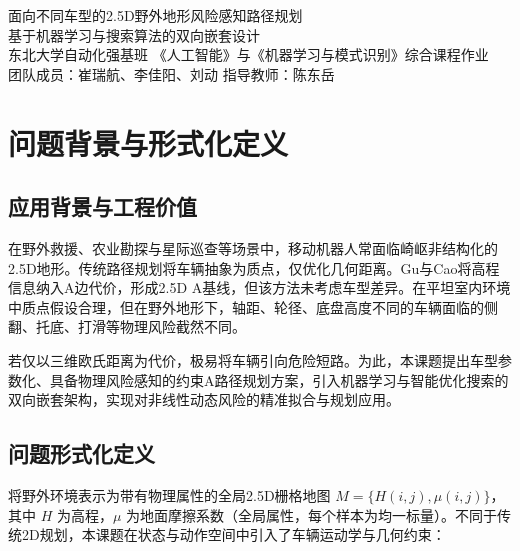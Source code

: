 \documentclass[12pt, a4paper]{article}
\begin{document}
{\centering
{\LARGE \heiti 面向不同车型的2.5D野外地形风险感知路径规划}\\[0.3ex]
{\Large \heiti 基于机器学习与搜索算法的双向嵌套设计}\\[1ex]
{\normalsize 东北大学自动化强基班 《人工智能》与《机器学习与模式识别》综合课程作业}\\[0.5ex]
{\normalsize 团队成员：崔瑞航、李佳阳、刘动 \quad 指导教师：陈东岳}\\[0.5ex]
\par}

\begin{abstract}
在野外复杂的2.5D地形中，传统仅依赖距离的路径规划方法难以适应不同车辆的物理通行能力差异。本设计提出了一种融合机器学习与智能优化搜索的路径规划架构：外层引入带有物理先验的风险约束A*算法，内层采用粒子群优化对CNN+MLP多任务风险预测模型进行拓扑与参数寻优。结合Gazebo物理仿真生成的高保真数据集以及ML+Geometric Guard保底机制，方案成功实现了同一复杂地形下针对不同车辆参数的自适应、低风险差异化规划。实验表明，该架构大幅降低了越野翻车和托底风险，显著提升了复杂非结构化环境下的规划成功率与系统鲁棒性。
\end{abstract}

\vspace{-0.5em}

\section{问题背景与形式化定义}

\subsection{应用背景与工程价值}
在野外救援、农业勘探与星际巡查等场景中，移动机器人常面临崎岖非结构化的2.5D地形。传统路径规划将车辆抽象为质点，仅优化几何距离。Gu与Cao\cite{gu2011path}将高程信息纳入A\*边代价，形成2.5D A\*基线，但该方法未考虑车型差异。在平坦室内环境中质点假设合理，但在野外地形下，轴距、轮径、底盘高度不同的车辆面临的侧翻、托底、打滑等物理风险截然不同。

若仅以三维欧氏距离为代价，极易将车辆引向危险短路。为此，本课题提出车型参数化、具备物理风险感知的约束A\*路径规划方案，引入机器学习与智能优化搜索的双向嵌套架构，实现对非线性动态风险的精准拟合与规划应用。

\subsection{问题形式化定义}
将野外环境表示为带有物理属性的全局2.5D栅格地图 \(M=\{H(i,j), \mu(i,j)\}\)，其中 \(H\) 为高程，\(\mu\) 为地面摩擦系数（全局属性，每个样本为均一标量）。不同于传统2D规划，本课题在状态与动作空间中引入了车辆运动学与几何约束：
\end{document}
